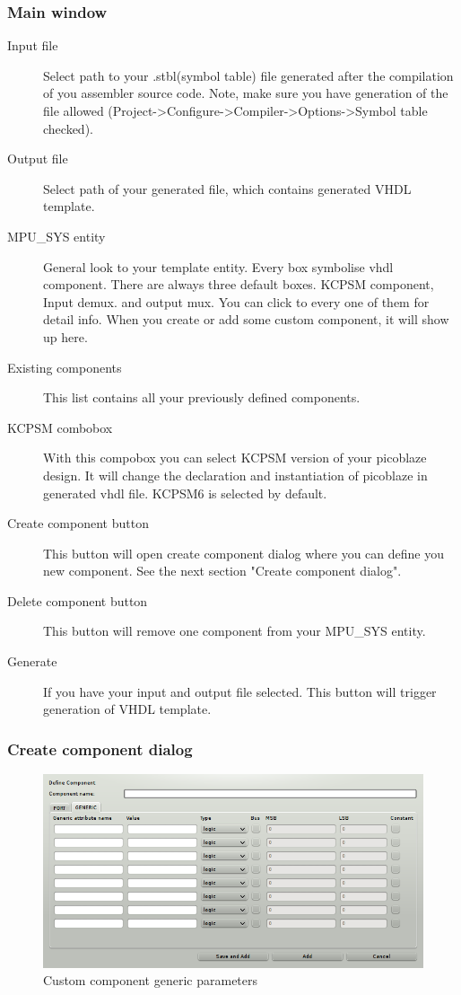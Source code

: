 \subsubsection{Main window}
    \begin{description}
        \item [Input file]
            Select path to your .stbl(symbol table) file generated after the compilation of you assembler source code. Note, make sure you
            have generation of the file allowed (Project->Configure->Compiler->Options->Symbol table checked).
        \item [Output file]
            Select path of your generated file, which contains generated VHDL template.
        \item [MPU\_SYS entity]
            General look to your template entity. Every box symbolise vhdl component. There are always three default boxes. KCPSM component, Input demux.
            and output mux. You can click to every one of them for detail info. When you create or add some custom component, it will show
            up here.
        \item [Existing components]
            This list contains all your previously defined components.
        \item [KCPSM combobox]
            With this compobox you can select KCPSM version of your picoblaze design. It will change the declaration and instantiation of picoblaze
            in generated vhdl file. KCPSM6 is selected by default.
        \item [Create component button]
            This button will open create component dialog where you can define you new component. See the next section "Create component dialog".
        \item [Delete component button]
            This button will remove one component from your MPU\_SYS entity.
        \item [Generate]
            If you have your input and output file selected. This button will trigger generation of VHDL template.
    \end{description}

\subsubsection{Create component dialog}

\begin{figure}[h]
    \centering
    \includegraphics[width=.5\textwidth]{img/VHDL_create_generic.png}
    \caption{Custom component generic parameters}
\end{figure}



